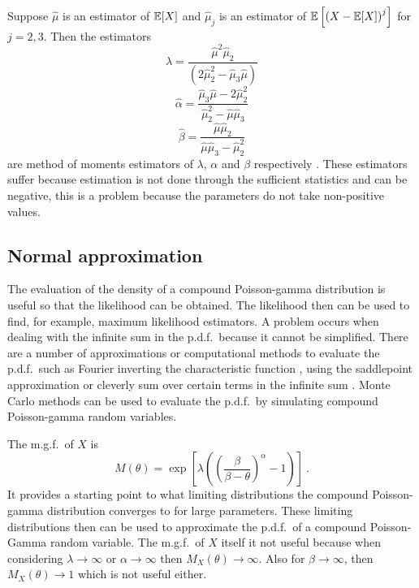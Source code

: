 Suppose $\widehat{\mu}$ is an estimator of $\operatorname{\mathbb{E}}[X]$ and $\widehat{\mu}_j$ is an estimator of $\operatorname{\mathbb{E}}\left[\left(X-\operatorname{\mathbb{E}}[X]\right)^j\right]$ for $j=2,3$. Then the estimators
\begin{equation}
  \widehat{\lambda}=\frac{\widehat{\mu}^2\widehat{\mu}_2}{\left(2\widehat{\mu}_2^2-\widehat{\mu}_3\widehat{\mu}\right)}
\end{equation}
\begin{equation}
  \widehat{\alpha}=\frac{\widehat{\mu}_3\widehat{\mu}-2\widehat{\mu}_2^2}{\widehat{\mu}_2^2-\widehat{\mu}\widehat{\mu}_3}
\end{equation}
\begin{equation}
  \widehat{\beta}=\frac{\widehat{\mu}\widehat{\mu}_2}{\widehat{\mu}\widehat{\mu}_3-\widehat{\mu}_2^2}
\end{equation}
are method of moments estimators of $\lambda$, $\alpha$ and $\beta$ respectively \citep{withers2011compound}. These estimators suffer because estimation is not done through the sufficient statistics and can be negative, this is a problem because the parameters do not take non-positive values.

\subsection{Normal approximation}

The evaluation of the density of a compound Poisson-gamma distribution is useful so that the likelihood can be obtained. The likelihood then can be used to find, for example, maximum likelihood estimators. A problem occurs when dealing with the infinite sum in the p.d.f.~because it cannot be simplified. There are a number of approximations or computational methods to evaluate the p.d.f.~such as Fourier inverting the characteristic function \citep{dunn2008evaluation}, using the saddlepoint approximation \citep{daniels1954saddlepoint} or cleverly sum over certain terms in the infinite sum \citep{dunn2005series}. Monte Carlo methods can be used to evaluate the p.d.f.~by simulating compound Poisson-gamma random variables.

The m.g.f.~of $X$ is
\begin{equation}
M(\theta)=\exp\left[\lambda\left(\left(\frac{\beta}{\beta-\theta}\right)^{\alpha}-1\right)\right]
\ .
\end{equation}
It provides a starting point to what limiting distributions the compound Poisson-gamma distribution converges to for large parameters. These limiting distributions then can be used to approximate the p.d.f.~of a compound Poisson-Gamma random variable. The m.g.f.~of $X$ itself it not useful because when considering $\lambda\rightarrow\infty$ or $\alpha\rightarrow\infty$ then $M_X(\theta)\rightarrow\infty$. Also for $\beta\rightarrow\infty$, then $M_X(\theta)\rightarrow 1$ which is not useful either.

